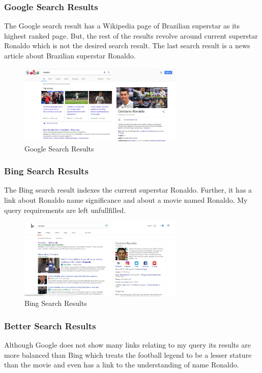 \documentclass[12pt]{report}
\begin{document}
\subsubsection{Google Search Results}
The Google search result has a Wikipedia page of Brazilian superstar as its highest ranked page. But, the rest of the results revolve around current superstar Ronaldo which is not the desired search result. The last search result is a news article about Brazilian superstar Ronaldo.

\begin{figure}[ht]
  \centering
  \includegraphics[width=0.7\textwidth]{Query3_Google.PNG}
  \caption{Google Search Results}
  \label{fig:5}
\end{figure}

\subsubsection{Bing Search Results}
The Bing search result indexes the current superstar Ronaldo. Further, it has a link about Ronaldo name significance and about a movie named Ronaldo. My query requirements are left unfullfilled.

\begin{figure}[ht]
  \centering
  \includegraphics[width=0.7\textwidth]{Query3_Bing.PNG}
  \caption{Bing Search Results}
  \label{fig:6}
\end{figure}

\subsubsection{Better Search Results}
Although Google does not show many links relating to my query its results are more balanced than Bing which treats the football legend to be a lesser stature than the movie and even has a link to the understanding of name Ronaldo.
\end{document}
